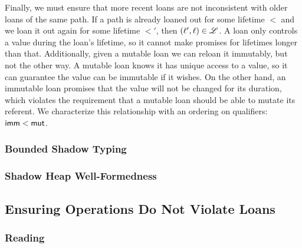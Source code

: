 Finally, we must ensure that more recent loans are not inconsistent with older loans
of the same path. If a path is already loaned out for some lifetime $\lt$ and
we loan it out again for some lifetime $\lt'$, then $(\ell', \ell) \in \mathscr{L}$.
A loan only controls a value during the loan's lifetime, so it cannot make promises
for lifetimes longer than that. Additionally, given a mutable loan we can reloan it immutably,
but not the other way. A mutable loan knows it has unique access to a value, so it can
guarantee the value can be immutable if it wishes. On the other hand, an immutable loan
promises that the value will not be changed for its duration, which violates the requirement
that a mutable loan should be able to mutate its referent. We characterize this relationship
with an ordering on qualifiers: $\mathsf{imm} < \mathsf{mut}$.
\newline

\fbox{$\bankwf{\ltr}{\$}{\lt}$}


\subsubsection*{Bounded Shadow Typing}
\subsubsection*{Shadow Heap Well-Formedness}


\subsection*{Ensuring Operations Do Not Violate Loans}
\subsubsection*{Reading}
